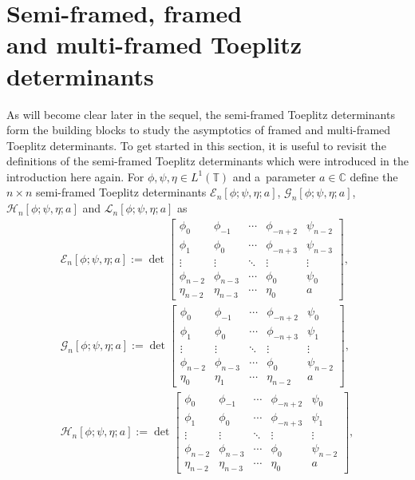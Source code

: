 \documentclass[pdftex]{sigma}
\numberwithin{equation}{section}
\newcommand{\C}{{\mathbb C}}
\newcommand{\T}{{\mathbb T}}
\begin{document}
\section[Semi-framed, framed and multi-framed Toeplitz determinants]{Semi-framed, framed \\
and multi-framed Toeplitz determinants}\label{section framed}
		As will become clear later in the sequel, the semi-framed Toeplitz determinants form the building blocks to study the asymptotics of framed and multi-framed Toeplitz determinants. To get started in this section, it is useful to revisit the definitions of the semi-framed Toeplitz determinants which were introduced in the introduction here again. For $\phi,\psi,\eta \in L^1(\T)$ and a~parameter $a \in \C$ define the $n\times n$ semi-framed Toeplitz determinants $\mathscr{E}_n[\phi;\psi,\eta;a]$, $\mathscr{G}_n[\phi;\psi,\eta;a]$, $\mathscr{H}_n[\phi;\psi,\eta;a]$ and $\mathscr{L}_n[\phi;\psi,\eta;a]$ as
		\begin{gather}%
			\mathscr{E}_n[\phi;\psi,\eta;a] := \det \begin{bmatrix}
				\phi_0& \phi_{-1} & \cdots & \phi_{-n+2} & \psi_{n-2} \\
				\phi_{1}& \phi_0 & \cdots & \phi_{-n+3} & \psi_{n-3} \\
				\vdots & \vdots & \ddots & \vdots & \vdots \\
				\phi_{n-2} & \phi_{n-3} & \cdots & \phi_{0} & \psi_{0} \\
				\eta_{n-2} & \eta_{n-3} & \cdots & \eta_{0} & a
			\end{bmatrix},\label{half-framed}
\\
			\mathscr{G}_n[\phi;\psi,\eta;a] := \det \begin{bmatrix}
				\phi_0& \phi_{-1} & \cdots & \phi_{-n+2} & \psi_{0} \\
				\phi_{1}& \phi_0 & \cdots & \phi_{-n+3} & \psi_{1} \\
				\vdots & \vdots & \ddots & \vdots & \vdots \\
				\phi_{n-2} & \phi_{n-3} & \cdots & \phi_{0} & \psi_{n-2} \\
				\eta_{0} & \eta_{1} & \cdots & \eta_{n-2} & a
			\end{bmatrix},
\\
			\mathscr{H}_n[\phi;\psi,\eta;a] := \det \begin{bmatrix}
				\phi_0& \phi_{-1} & \cdots & \phi_{-n+2} & \psi_{0} \\
				\phi_{1}& \phi_0 & \cdots & \phi_{-n+3} & \psi_{1} \\
				\vdots & \vdots & \ddots & \vdots & \vdots \\
				\phi_{n-2} & \phi_{n-3} & \cdots & \phi_{0} & \psi_{n-2} \\
				\eta_{n-2} & \eta_{n-3} & \cdots & \eta_{0} & a
			\end{bmatrix},\label{half-framed 2}
		\end{gather}
\end{document}
